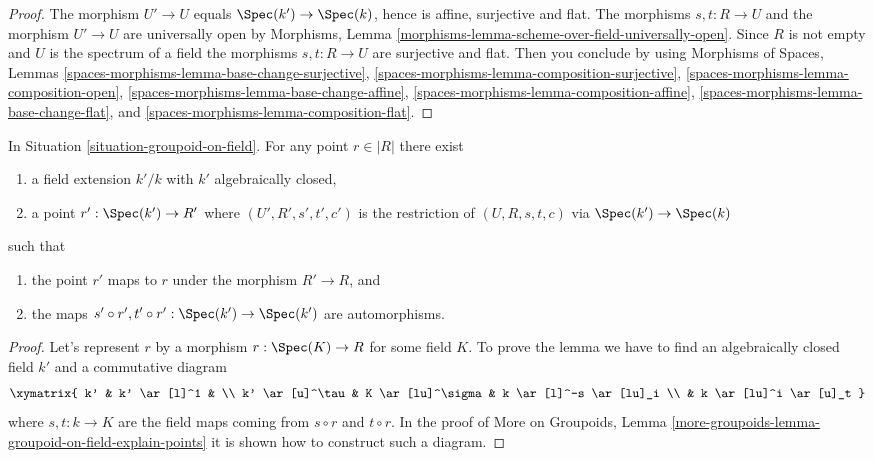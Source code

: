 \begin{proof}
The morphism $U' \to U$ equals $\Spec(k') \to \Spec(k)$,
hence is affine, surjective and flat. The morphisms $s, t : R \to U$
and the morphism $U' \to U$ are universally open by
Morphisms, Lemma \ref{morphisms-lemma-scheme-over-field-universally-open}.
Since $R$ is not empty and $U$ is the spectrum of a field the morphisms
$s, t : R \to U$ are surjective and flat. Then you conclude by using
Morphisms of Spaces, Lemmas
\ref{spaces-morphisms-lemma-base-change-surjective},
\ref{spaces-morphisms-lemma-composition-surjective},
\ref{spaces-morphisms-lemma-composition-open},
\ref{spaces-morphisms-lemma-base-change-affine},
\ref{spaces-morphisms-lemma-composition-affine},
\ref{spaces-morphisms-lemma-base-change-flat}, and
\ref{spaces-morphisms-lemma-composition-flat}.
\end{proof}

\begin{lemma}
\label{lemma-groupoid-on-field-explain-points}
In
Situation \ref{situation-groupoid-on-field}.
For any point $r \in |R|$ there exist
\begin{enumerate}
\item a field extension $k'/k$ with $k'$ algebraically closed,
\item a point $r' : \Spec(k') \to R'$ where
$(U', R', s', t', c')$ is the restriction of $(U, R, s, t, c)$
via $\Spec(k') \to \Spec(k)$
\end{enumerate}
such that
\begin{enumerate}
\item the point $r'$ maps to $r$ under the morphism $R' \to R$, and
\item the maps
$s' \circ r', t' \circ r' : \Spec(k') \to \Spec(k')$
are automorphisms.
\end{enumerate}
\end{lemma}

\begin{proof}
Let's represent $r$ by a morphism $r : \Spec(K) \to R$ for some
field $K$. To prove the lemma we have to find an algebraically closed
field $k'$ and a commutative diagram
$$
\xymatrix{
k' & k' \ar[l]^1 & \\
k' \ar[u]^\tau & K \ar[lu]^\sigma & k \ar[l]^-s \ar[lu]_i \\
& k \ar[lu]^i \ar[u]_t
}
$$
where $s, t : k \to K$ are the field maps coming from
$s \circ r$ and $t \circ r$. In the proof of
More on Groupoids,
Lemma \ref{more-groupoids-lemma-groupoid-on-field-explain-points}
it is shown how to construct such a diagram.
\end{proof}

